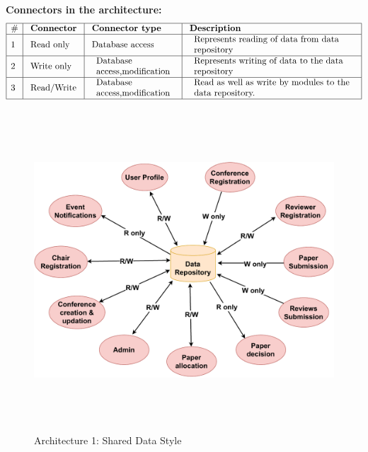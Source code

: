 \documentclass[english,a4paper,12pt]{report}
\begin{document}
\textbf{Connectors in the architecture:}
$$
\begin{array}{|l|l|l|l|}
\hline \# & \text { \textbf{Connector} } & \text { \textbf{Connector type} } & \text { \textbf{Description} } \\
\hline 1 & \text { Read only } & \text { Database access } & \begin{array}{l}
\text { Represents reading of data from data } \\
\text { repository }
\end{array} \\
\hline 2 & \text { Write only } & \begin{array}{l}
\text { Database } \\
\text { access,modification }
\end{array} & \begin{array}{l}
\text { Represents writing of data to the data } \\
\text { repository }
\end{array} \\
\hline 3 & \text { Read/Write } & \begin{array}{l}
\text { Database } \\
\text { access,modification }
\end{array} & \begin{array}{l}
\text { Read as well as write by modules to the } \\
\text { data repository. }
\end{array} \\
\hline 
\end{array}
$$

\begin{figure}[h!]
\centering
 \includegraphics[keepaspectratio,width=25cm,height=12cm]{SA-Images/Arch1.pdf}
 \caption{Architecture 1: Shared Data Style}
\end{figure}
\end{document}
